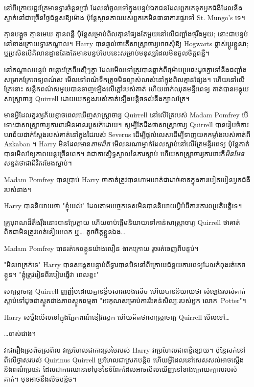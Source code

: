 {នៅពីក្រោយជួរគ្រែមានទ្វារចំនួនប្រាំ ដែលនាំចូលទៅក្នុងបន្ទប់ឯកជនដែលពួកគេទុកអ្នកជំងឺដែលនឹងស្នាក់នៅជាច្រើនថ្ងៃជំនួសឱ្យម៉ោង ប៉ុន្តែស្ថានភាពរបស់ពួកគេមិនធានាការផ្ទេរទៅ St. Mungo's ទេ។

គ្មានបង្អួច គ្មានមេឃ គ្មានពន្លឺ ប៉ុន្តែសម្រាប់ពិលគ្មានផ្សែងតែមួយនៅលើជញ្ជាំងថ្មរឹងមួយ; នោះជាបន្ទប់នៅខាងក្រោយទ្វារកណ្តាល។ Harry បានឆ្ងល់ថាតើសាស្រ្តាចារ្យអាចសុំឱ្យ Hogwarts ផ្លាស់ប្តូរខ្លួនវា; ឬប្រសិនបើគិលានដ្ឋានតែងតែមានបន្ទប់បែបនេះសម្រាប់មនុស្សដែលមិនចូលចិត្តពន្លឺ។

នៅកណ្តាលបន្ទប់ ចន្លោះគ្រែពីរស្មើៗគ្នា ដែលមើលទៅត្រូវបានឆ្លាក់ពីថ្មម៉ាបប្រផេះដូចគ្នាទៅនឹងជញ្ជាំង សម្រាកគ្រែពេទ្យពណ៌ស មើលទៅពណ៌ទឹកក្រូចមិនច្បាស់លាស់នៅក្នុងពិលគ្មានផ្សែង។ ហើយនៅលើគ្រែនោះ សន្លឹកពណ៌សមួយបានទាញឡើងលើភ្លៅរបស់គាត់ ហើយពាក់ឈុតមន្ទីរពេទ្យ គាត់បានអង្គុយសាស្ត្រាចារ្យ Quirrell ដោយយកខ្នងរបស់គាត់ឡើងបន្តិចទល់នឹងក្បាលគ្រែ។

មាន​អ្វី​ដែល​គួរ​ឲ្យ​ភ័យ​ខ្លាច​ពេល​ឃើញ​សាស្ត្រាចារ្យ Quirrell នៅ​លើ​គ្រែ​របស់ Madam Pomfrey បើ​ទោះ​ជា​សាស្ត្រាចារ្យ​ការពារ​មិន​មាន​របួស​ក៏​ដោយ។ សូម្បីតែដឹងថាសាស្រ្តាចារ្យ Quirrell បានរៀបចំការបរាជ័យជាក់ស្តែងរបស់គាត់នៅក្នុងដៃរបស់ Severus ដើម្បីផ្តល់លេសដើម្បីទាញយកកម្លាំងរបស់គាត់ពី Azkaban ។ Harry មិនដែលមាន\emph{តាមពិត} មើលនរណាម្នាក់ដែលស្លាប់នៅលើគ្រែមន្ទីរពេទ្យ ប៉ុន្តែគាត់បានមើលខ្សែភាពយន្តច្រើនពេក។ វាជាការស្និទ្ធស្នាលនៃការស្លាប់ ហើយសាស្រ្តាចារ្យការពារគឺ\emph{មិនមែន} សន្មត់ថាជាជីវិតរមែងស្លាប់។

Madam Pomfrey បានប្រាប់ Harry ថាគាត់ត្រូវបានហាមឃាត់ជាដាច់ខាតក្នុងការបៀតបៀនអ្នកជំងឺរបស់នាង។

Harry បាននិយាយថា "ខ្ញុំយល់" ដែលតាមបច្ចេកទេសមិនបាននិយាយអ្វីអំពីការគោរពប្រតិបត្តិទេ។

គ្រូបុរាណដ៏តឹងរ៉ឹងនោះបានប្រែក្លាយ ហើយចាប់ផ្តើមនិយាយទៅកាន់សាស្រ្តាចារ្យ Quirrell ថាគាត់ពិតជាមិនត្រូវហត់នឿយពេក ឬ… តូចចិត្តខ្លួនឯង…

Madam Pomfrey បានរត់គេចខ្លួនយ៉ាងលឿន ងាកក្រោយ រួចរត់ចេញពីបន្ទប់។

"មិនអាក្រក់ទេ" Harry បានសង្កេតបន្ទាប់ពីទ្វារបានបិទនៅពីក្រោយជំនួយការពេទ្យដែលកំពុងរត់គេចខ្លួន។ "ខ្ញុំត្រូវរៀនពីរបៀបធ្វើវា ពេលខ្លះ"

សាស្ត្រាចារ្យ Quirrell ញញឹមដោយគ្មានខ្លឹមសារលេងសើច ហើយបាននិយាយថា សំឡេងរបស់គាត់ស្តាប់ទៅដូចជាស្ងួតជាងភាពស្ងួតធម្មតា "អរគុណសម្រាប់ការរិះគន់សិល្បៈរបស់អ្នក លោក~Potter"។

Harry សម្លឹងមើលទៅក្នុងភ្នែកពណ៌ខៀវស្លេក ហើយគិតថាសាស្រ្តាចារ្យ Quirrell មើលទៅ…

…ចាស់ជាង។

វា​ជា​រឿង​ស្រពិចស្រពិល វា​ប្រហែល​ជា​ការ​ស្រមៃ​របស់ Harry វា​ប្រហែល​ជា​ពន្លឺ​ខ្សោយ។ ប៉ុន្តែសក់នៅពីលើថ្ងាសរបស់ Quirinus Quirrell ប្រហែលជាស្រកបន្តិច ហើយអ្វីដែលនៅសេសសល់អាចស្តើង និងពណ៌ប្រផេះ ដែលជាការឈានទៅមុខនៃទំពែកដែលអាចមើលឃើញនៅខាងក្រោយក្បាលរបស់គាត់។ មុខ​អាច​នឹង​លិច​បន្តិច។

}
